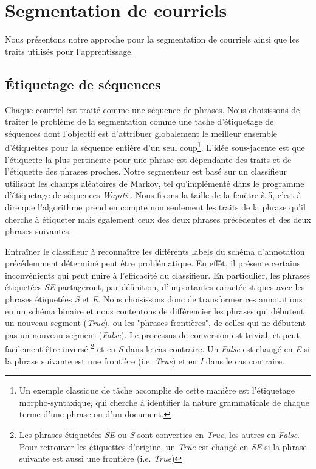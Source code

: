 
\chapter{Segmentation de courriels}

\label{ch:methodology_for_email_segmentation}

Nous présentons notre approche pour la segmentation de courriels ainsi que les traits utilisés pour l'apprentissage.

\section{Étiquetage de séquences}

Chaque courriel est traité comme une séquence de phrases. Nous choisissons de traiter le problème de la segmentation comme une tache d'étiquetage de séquences dont l'objectif est d'attribuer globalement le meilleur ensemble d'étiquettes pour la séquence entière d'un seul coup\footnote{Un exemple classique de tâche accomplie de cette manière est l'étiquetage morpho-syntaxique, qui cherche à identifier la nature grammaticale de chaque terme d'une phrase ou d'un document.}. L'idée sous-jacente est que l'étiquette la plus pertinente pour une phrase est dépendante des traits et de l'étiquette des phrases proches. Notre segmenteur est basé sur un classifieur utilisant les champs aléatoires de Markov, tel qu'implémenté dans le programme d'étiquetage de séquences \textit{Wapiti} \cite{lavergne2010practical}. Nous fixons la taille de la fenêtre à 5, c'est à dire que l'algorithme prend en compte non seulement les traits de la phrase qu'il cherche à étiqueter mais également ceux des deux phrases précédentes et des deux phrases suivantes.

Entraîner le classifieur à reconnaître les différents labels du schéma d'annotation précédemment déterminé peut être problématique. En effêt, il présente certains inconvénients qui peut nuire à l'efficacité du classifieur. En particulier, les phrases étiquetées \textit{SE} partageront, par définition, d'importantes caractéristiques avec les phrases étiquetées \textit{S} et \textit{E}. Nous choisissons donc de transformer ces annotations en un schéma binaire et nous contentons de différencier les phrases qui débutent un nouveau segment (\textit{True}), ou les "phrases-frontières", de celles qui ne débutent pas un nouveau segment (\textit{False}). Le processus de conversion est trivial, et peut facilement être inversé \footnote{Les phrases étiquetées \textit{SE} ou \textit{S} sont converties en \textit{True}, les autres en \textit{False}. Pour retrouver les étiquettes d'origine, un \textit{True} est changé en \textit{SE} si la phrase suivante est aussi une frontière (i.e. \textit{True})} et en \textit{S} dans le cas contraire. Un \textit{False} est changé en \textit{E} si la phrase suivante est une frontière (i.e. \textit{True}) et en \textit{I} dans le cas contraire.

